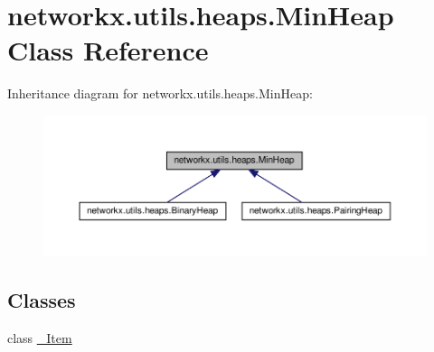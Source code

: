 \hypertarget{classnetworkx_1_1utils_1_1heaps_1_1MinHeap}{}\section{networkx.\+utils.\+heaps.\+Min\+Heap Class Reference}
\label{classnetworkx_1_1utils_1_1heaps_1_1MinHeap}


Inheritance diagram for networkx.\+utils.\+heaps.\+Min\+Heap\+:
\nopagebreak
\begin{figure}[H]
\begin{center}
\leavevmode
\includegraphics[width=350pt]{classnetworkx_1_1utils_1_1heaps_1_1MinHeap__inherit__graph}
\end{center}
\end{figure}
\subsection*{Classes}
\begin{DoxyCompactItemize}
\item 
class \hyperlink{classnetworkx_1_1utils_1_1heaps_1_1MinHeap_1_1__Item}{\+\_\+\+Item}
\end{DoxyCompactItemize}
